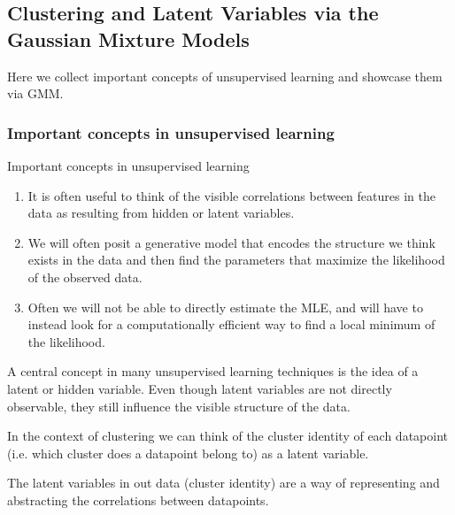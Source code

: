 \subsection{Clustering and Latent Variables via the Gaussian Mixture Models}
\label{subsec:clusterConcepts}
Here we collect important concepts of unsupervised learning and showcase them via GMM.
\subsubsection{Important concepts in unsupervised learning}
\label{subsubsec:clusterConceptsCollection}

\begin{mybox}{Important concepts in unsupervised learning}
	\label{subsubsec:clusterConceptsCollectionImportant}
\begin{enumerate}
\item It is often useful to think of the visible correlations between features in the data as resulting from hidden or latent variables.
\item We will often posit a generative model that encodes the structure we think exists in the data and then find the parameters that maximize the likelihood of the observed data.
\item Often we will not be able to directly estimate the MLE, and will have to instead look for a computationally efficient way to find a local minimum of the likelihood.
\end{enumerate}
\end{mybox}
A central concept in many unsupervised learning techniques is the idea of a latent or hidden variable. Even though latent variables are not directly observable, they still influence the visible structure of the data. 
\begin{example}
In the context of clustering we can think of the cluster identity of each datapoint (i.e. which cluster does a datapoint belong to) as a latent variable.
\end{example}
The latent variables in out data (cluster identity) are a way of representing and abstracting the correlations between datapoints.\\


